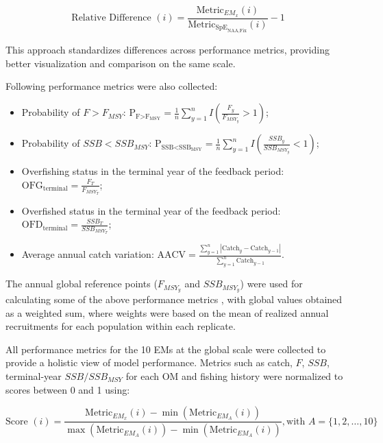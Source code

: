 \documentclass[
  12pt,
]{article}
\begin{document}
\begin{equation}
\text{Relative Difference }(i) = \frac{\text{Metric}_{EM_{x}}(i)}{\text{Metric}_{\text{SpE}_{\scriptscriptstyle \text{NAA,Fix}}}(i)} - 1
\end{equation}

This approach standardizes differences across performance metrics,
providing better visualization and comparison on the same scale.

Following performance metrics were also collected:

\begin{itemize}
\item
  Probability of \({F} > {F_{MSY}}\):
  \(\text{P}_{\text{F>F}_{\text{MSY}}} = \frac{1}{n} \sum_{y=1}^{n} I\left( \frac{F_y}{F_{MSY_{y}}} > 1 \right)\);
\item
  Probability of \({SSB} < {SSB_{MSY}}\):
  \(\text{P}_{\text{SSB<SSB}_{\text{MSY}}} = \frac{1}{n} \sum_{y=1}^{n} I\left( \frac{SSB_y}{SSB_{MSY_{y}}} < 1 \right)\);
\item
  Overfishing status in the terminal year of the feedback period:
  \(\text{OFG}_\text{terminal} = \frac{F_T}{F_{MSY_{T}}}\);
\item
  Overfished status in the terminal year of the feedback period:
  \(\text{OFD}_\text{terminal} = \frac{SSB_T}{SSB_{MSY_{T}}}\);
\item
  Average annual catch variation:
  \(\text{AACV} = \frac{\sum_{y=1}^{n} \left|\text{Catch}_{y} - \text{Catch}_{y-1}\right|}{\sum_{y=1}^{n} \text{Catch}_{y-1}}\).
\end{itemize}

The annual global reference points (\(F_{MSY_{y}}\) and
\(SSB_{MSY_{y}}\)) were used for calculating some of the above
performance metrics \citep{Miller2025}, with global values obtained as a
weighted sum, where weights were based on the mean of realized annual
recruitments for each population within each replicate.

All performance metrics for the 10 EMs at the global scale were
collected to provide a holistic view of model performance. Metrics such
as catch, \(F\), \(SSB\), terminal-year \(SSB/SSB_{MSY}\) for each OM
and fishing history were normalized to scores between 0 and 1 using:

\begin{equation}
\text{Score } (i) = \frac{\text{Metric}_{EM_x}(i) - \min(\text{Metric}_{EM_{A}}(i))}{\max(\text{Metric}_{EM_{A}}(i)) - \min(\text{Metric}_{EM_{A}}(i))}, \text{with } A = \{1, 2, \dots, 10\}
\end{equation}
\end{document}
